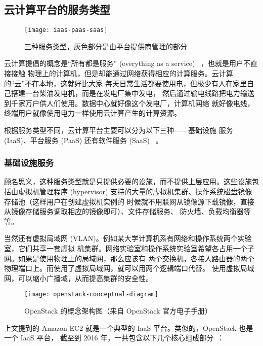 \subsection{云计算平台的服务类型}

\begin{figure}[h]
    \centering
    \texttt{[image: iaas-paas-saas]}
    \caption{三种服务类型，灰色部分是由平台提供商管理的部分}
\end{figure}

云计算提倡的概念是“所有都是服务”
 (everything as a service) ~\cite{cloud-and-openstack}，也就是用户不直接接触
物理上的计算机，但是却能通过网络获得相应的计算服务。云计算的“云”不在本地，这就好比大家
每天日常生活都要使用电，但极少有人在家里自己搭建一台柴油发电机，而是在发电厂集中发电，
然后通过输电线路把电力输送到千家万户供人们使用。数据中心就好像这个发电厂，计算机网络
就好像电线，终端用户就像使用电力一样使用云计算产生的计算资源。

根据服务类型不同，云计算平台主要可以分为以下三种——基础设施
服务 (IaaS)、平台服务 (PaaS) 还有软件服务 (SaaS) ~\cite{types-of-cloud}。

\subsubsection{基础设施服务}

顾名思义，这种服务类型就是只提供必要的设施，而不提供上层应用。这些设施包括由虚拟机管理程序
 (hypervisor) 支持的大量的虚拟机集群、操作系统磁盘镜像存储池（这样用户在创建虚拟机实例的
时候就不用联网从镜像源下载镜像，直接从镜像存储服务调取相应的镜像即可）、文件存储服务、
防火墙、负载均衡器等等。

当然还有虚拟局域网 (VLAN)。例如某大学计算机系有网络和操作系统两个实验室，它们共享一套虚拟
机集群。网络实验室和操作系统实验室希望各占用一个子网。如果是使用物理上的局域网，那么应该有
两个交换机，各接入路由器的两个物理端口上。而使用了虚拟局域网，就可以用两个逻辑端口代替。
使用虚拟局域网，可以缩小广播域，从而提高集群的安全性。

\begin{figure}[h]
    \centering
    \texttt{[image: openstack-conceptual-diagram]}
    \caption{OpenStack 的概念架构图（来自 OpenStack 官方电子手册）}
\end{figure}

上文提到的 Amazon EC2 就是一个典型的 IaaS 平台。类似的，OpenStack 也是一个 IaaS 平台，
截至到 2016 年，一共包含以下几个核心组成部分~\cite{openstack}：


